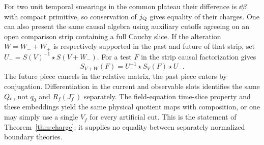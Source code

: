 For two unit temporal smearings in the common plateau their difference is \(\dd\beta\) with compact primitive, so conservation of \(j_{\rm Q}\) gives equality of their charges. One can also present the same causal algebra using auxiliary cutoffs agreeing on an open comparison strip containing a full Cauchy slice. If the alteration \(W=W_-+W_+\) is respectively supported in the past and future of that strip, set \(U_-=S(V)^{-1}\star S(V+W_-)\). For a test \(F\) in the strip causal factorization gives
\[
 S_{V+W}(F)=U_-^{-1}\star S_V(F)\star U_- .
\]
The future piece cancels in the relative matrix, the past piece enters by conjugation. Differentiation in the current and observable slots identifies the same \(Q_{\mathrm c}\), not \(q_0\) and \(R_f(J_f^-)\) separately. The field-equation time-slice property and these embeddings yield the same physical quotient maps with composition, or one may simply use a single \(V_f\) for every artificial cut. This is the statement of Theorem~\ref{thm:charge}; it supplies no equality between separately normalized boundary theories.

